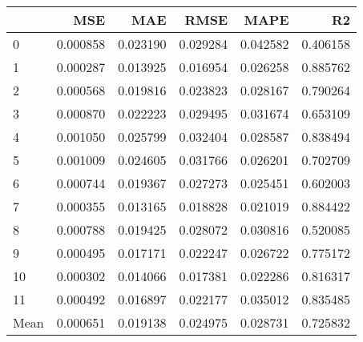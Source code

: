 \begin{tabular}{lrrrrr}
\toprule
 & MSE & MAE & RMSE & MAPE & R2 \\
\midrule
0 & 0.000858 & 0.023190 & 0.029284 & 0.042582 & 0.406158 \\
1 & 0.000287 & 0.013925 & 0.016954 & 0.026258 & 0.885762 \\
2 & 0.000568 & 0.019816 & 0.023823 & 0.028167 & 0.790264 \\
3 & 0.000870 & 0.022223 & 0.029495 & 0.031674 & 0.653109 \\
4 & 0.001050 & 0.025799 & 0.032404 & 0.028587 & 0.838494 \\
5 & 0.001009 & 0.024605 & 0.031766 & 0.026201 & 0.702709 \\
6 & 0.000744 & 0.019367 & 0.027273 & 0.025451 & 0.602003 \\
7 & 0.000355 & 0.013165 & 0.018828 & 0.021019 & 0.884422 \\
8 & 0.000788 & 0.019425 & 0.028072 & 0.030816 & 0.520085 \\
9 & 0.000495 & 0.017171 & 0.022247 & 0.026722 & 0.775172 \\
10 & 0.000302 & 0.014066 & 0.017381 & 0.022286 & 0.816317 \\
11 & 0.000492 & 0.016897 & 0.022177 & 0.035012 & 0.835485 \\
Mean & 0.000651 & 0.019138 & 0.024975 & 0.028731 & 0.725832 \\
\bottomrule
\end{tabular}

